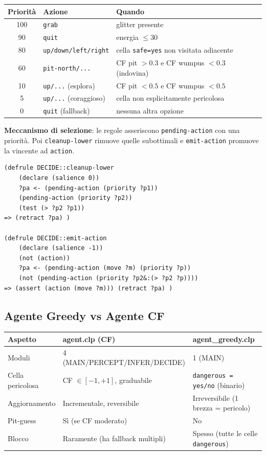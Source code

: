\documentclass[12pt,a4paper]{article}
\begin{document}
\begin{center}
\renewcommand{\arraystretch}{1.3}
\begin{tabular}{cll}
\toprule
\textbf{Priorità} & \textbf{Azione} & \textbf{Quando} \\
\midrule
100 & \texttt{grab} & glitter presente \\
90  & \texttt{quit} & energia $\le 30$ \\
80  & \texttt{up/down/left/right} & cella \texttt{safe=yes} non visitata adiacente \\
60  & \texttt{pit-north/...} & CF pit $> 0.3$ e CF wumpus $< 0.3$ (indovina) \\
10  & \texttt{up/...} (esplora) & CF pit $< 0.5$ e CF wumpus $< 0.5$ \\
5   & \texttt{up/...} (coraggioso) & cella non esplicitamente pericolosa \\
0   & \texttt{quit} (fallback) & nessuna altra opzione \\
\bottomrule
\end{tabular}
\end{center}

\textbf{Meccanismo di selezione}: le regole asseriscono \texttt{pending-action}
con una priorità. Poi \texttt{cleanup-lower} rimuove quelle subottimali e
\texttt{emit-action} promuove la vincente ad \texttt{action}.

\begin{lstlisting}[language=CLIPS]
(defrule DECIDE::cleanup-lower
    (declare (salience 0))
    ?pa <- (pending-action (priority ?p1))
    (pending-action (priority ?p2))
    (test (> ?p2 ?p1))
=> (retract ?pa) )

(defrule DECIDE::emit-action
    (declare (salience -1))
    (not (action))
    ?pa <- (pending-action (move ?m) (priority ?p))
    (not (pending-action (priority ?p2&:(> ?p2 ?p))))
=> (assert (action (move ?m))) (retract ?pa) )
\end{lstlisting}

\subsection{Agente Greedy vs Agente CF}

\begin{center}
\renewcommand{\arraystretch}{1.4}
\begin{tabular}{lll}
\toprule
\textbf{Aspetto} & \textbf{agent.clp (CF)} & \textbf{agent\_greedy.clp} \\
\midrule
Moduli & 4 (MAIN/PERCEPT/INFER/DECIDE) & 1 (MAIN) \\
Cella pericolosa & CF $\in [-1, +1]$, graduabile & \texttt{dangerous = yes/no} (binario) \\
Aggiornamento & Incrementale, reversibile & Irreversibile (1 brezza = pericolo) \\
Pit-guess & Sì (se CF moderato) & No \\
Blocco & Raramente (ha fallback multipli) & Spesso (tutte le celle \texttt{dangerous}) \\
\bottomrule
\end{tabular}
\end{center}
\end{document}
